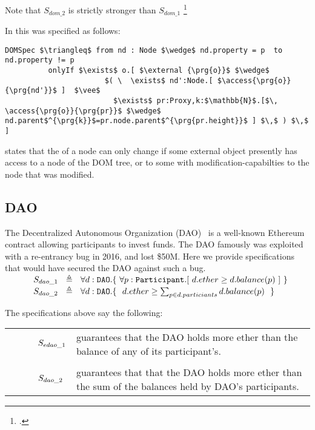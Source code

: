 Note that $S_{dom\_2}$ is strictly stronger than $S_{dom\_1}$ \footnote{.}

\vspace{.1cm}

In  \cite{OOPSLA22} this was specified as follows:
 
 \begin{lstlisting}[language = Chainmail, mathescape=true, frame=lines]
DOMSpec $\triangleq$ from nd : Node $\wedge$ nd.property = p  to nd.property != p
          onlyIf $\exists$ o.[ $\external {\prg{o}}$ $\wedge$ 
                       $( \  \exists$ nd':Node.[ $\access{\prg{o}}{\prg{nd'}}$ ]  $\vee$ 
                         $\exists$ pr:Proxy,k:$\mathbb{N}$.[$\, \access{\prg{o}}{\prg{pr}}$ $\wedge$ nd.parent$^{\prg{k}}$=pr.node.parent$^{\prg{pr.height}}$ ] $\,$ ) $\,$ ]
\end{lstlisting}

 states that the  of a node can only change if
some external object presently has 
access to a node of the DOM tree, or to some  with modification-capabilties
to the node that was modified.


\subsection{DAO}
The Decentralized Autonomous Organization (DAO)~\cite{Dao}  is a well-known Ethereum contract allowing 
participants to invest funds. The DAO famously was exploited with a re-entrancy bug in 2016, 
and lost \$50M. Here we provide specifications that would have secured the DAO against such a 
bug. 
\\ 
$\strut \SPSP  S_{dao\_1}\ \  \triangleq \ \ \TwoStatesN{ d:\prg{DAO}}{\ \forall p:\prg{Participant}. [\ d.ether \geq d.balance(p) \ ]   \ }$ 
\\
$\strut \SPSP  S_{dao\_2}\ \  \triangleq \ \ \TwoStatesN{ d:\prg{DAO}}{\ \ d.ether \geq \sum_{p \in d.particiants} d.balance(p)\  \ }$ 


The specifications above say the following:
\\
\begin{tabular}{ll}
\begin{minipage}{.10\textwidth}
$\strut \ \ \ \ \ \ \ \ \ \   S_{edao\_1}$
\end{minipage}
&
\begin{minipage}{.85\textwidth}
guarantees that the DAO holds more ether than the balance  of any of its  participant's.
\end{minipage}
\\
\\
\begin{minipage}{.10\textwidth}
$\strut \ \ \ \ \ \ \ \ \ \   S_{dao\_2}$ 
\end{minipage}
&
\begin{minipage}{.85\textwidth}
guarantees that that the DAO holds more ether than the sum  of the balances held by DAO's participants.
\end{minipage}
\end{tabular}

